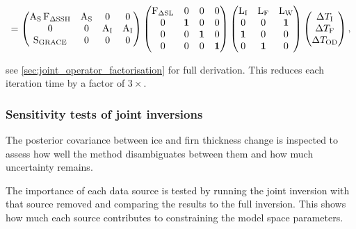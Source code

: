 \begin{equation}
=
\begin{pmatrix}
    \operatorname{{A}}_{{\mathrm{S}}} \operatorname{{F}}_{{\Delta \mathrm{SSH}}} & \operatorname{{A}}_{{\mathrm{S}}} & 0 & 0 \\
    0 & 0 & \operatorname{{A}}_{{\mathrm{I}}} & \operatorname{{A}}_{{\mathrm{I}}} \\
    \operatorname{{S}}_{{\mathrm{GRACE}}} & 0 & 0 & 0
\end{pmatrix}
\begin{pmatrix}
\operatorname{{F}}_{{\Delta \mathrm{SL}}} & 0 & 0 & 0 \\
0 & \mathbf{1} & 0 & 0 \\
0 & 0 & \mathbf{1} & 0 \\
0 & 0 & 0 & \mathbf{1}
\end{pmatrix}
\begin{pmatrix}
\operatorname{{L}}_{{\text{I}}} & \operatorname{{L}}_{{\text{F}}} & \operatorname{{L}}_{{\text{W}}} \\
0 & 0 & \mathbf{1} \\
\mathbf{1} & 0 & 0 \\
0 & \mathbf{1} & 0
\end{pmatrix}
\begin{pmatrix}
\Delta T_\text{I} \\
\Delta T_\text{F} \\
\Delta T_\text{OD}
\end{pmatrix},\label{eq:factorised_joint}
\end{equation}


see \autoref{sec:joint_operator_factorisation} for full derivation. This reduces each iteration time by a factor of $3\times$.

\subsubsection{Sensitivity tests of joint inversions}

The posterior covariance between ice and firn thickness change is inspected to assess how well the method disambiguates between them and how much uncertainty remains.

The importance of each data source is tested by running the joint inversion with that source removed and comparing the results to the full inversion. This shows how much each source contributes to constraining the model space parameters.
